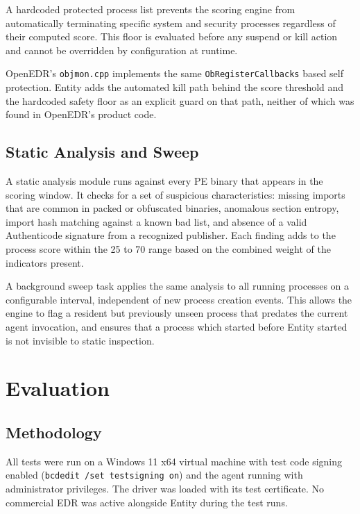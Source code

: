 \documentclass[10pt,twocolumn,letterpaper]{article}
\newcommand{\code}[1]{\texttt{\small #1}}
\begin{document}
A hardcoded protected process list prevents the scoring engine from automatically
terminating specific system and security processes regardless of their computed score.
This floor is evaluated before any suspend or kill action and cannot be overridden by
configuration at runtime.

OpenEDR's \code{objmon.cpp} implements the same \code{ObRegisterCallbacks} based self
protection. Entity adds the automated kill path behind the score threshold and the
hardcoded safety floor as an explicit guard on that path, neither of which was found in
OpenEDR's product code.

\subsection{Static Analysis and Sweep}
\label{sec:static}

A static analysis module runs against every PE binary that appears in the scoring window.
It checks for a set of suspicious characteristics: missing imports that are common in
packed or obfuscated binaries, anomalous section entropy, import hash matching against a
known bad list, and absence of a valid Authenticode signature from a recognized publisher.
Each finding adds to the process score within the 25 to 70 range based on the combined
weight of the indicators present.

A background sweep task applies the same analysis to all running processes on a
configurable interval, independent of new process creation events. This allows the engine
to flag a resident but previously unseen process that predates the current agent
invocation, and ensures that a process which started before Entity started is not
invisible to static inspection.

\section{Evaluation}
\label{sec:eval}

\subsection{Methodology}

All tests were run on a Windows 11 x64 virtual machine with test code signing enabled
(\code{bcdedit /set testsigning on}) and the agent running with administrator privileges.
The driver was loaded with its test certificate. No commercial EDR was active alongside
Entity during the test runs.
\end{document}
